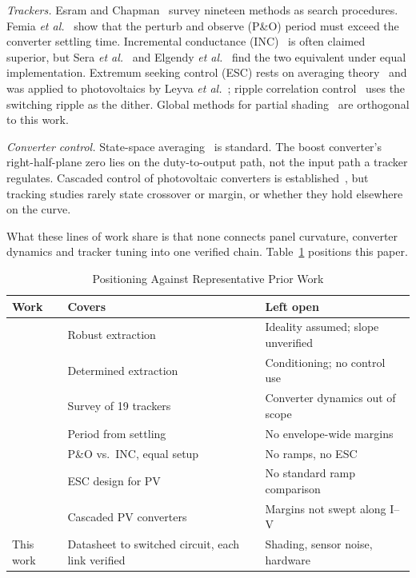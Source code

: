 \documentclass[journal]{IEEEtran}
\begin{document}
\emph{Trackers.} Esram and Chapman~\cite{esram} survey nineteen methods as search procedures. Femia
\emph{et al.}~\cite{femia,femia_book} show that the perturb and observe (P\&O) period must exceed the
converter settling time. Incremental conductance (INC)~\cite{hussein} is often claimed superior, but Sera
\emph{et al.}~\cite{sera} and Elgendy \emph{et al.}~\cite{elgendy} find the two equivalent under equal
implementation. Extremum seeking control (ESC) rests on averaging theory~\cite{krstic,ariyur} and was
applied to photovoltaics by Leyva \emph{et al.}~\cite{leyva}; ripple correlation control~\cite{rcc} uses
the switching ripple as the dither. Global methods for partial shading~\cite{nguyen} are orthogonal to
this work.

\emph{Converter control.} State-space averaging~\cite{middlebrook,erickson} is standard. The boost
converter's right-half-plane zero lies on the duty-to-output path, not the input path a tracker regulates.
Cascaded control of photovoltaic converters is established~\cite{bratcu,kjaer}, but tracking studies
rarely state crossover or margin, or whether they hold elsewhere on the curve.

What these lines of work share is that none connects panel curvature, converter dynamics and tracker
tuning into one verified chain. Table~\ref{tab:related} positions this paper.

\begin{table}[!t]
\centering
\caption{Positioning Against Representative Prior Work}
\label{tab:related}
\footnotesize
\setlength{\tabcolsep}{3pt}
\begin{tabular}{@{}>{\raggedright}p{}>{\raggedright}p{}>{\raggedright\arraybackslash}p{}@{}}
\toprule
Work & Covers & Left open \\
\midrule
\cite{villalva} & Robust extraction & Ideality assumed; slope unverified \\
\cite{desoto} & Determined extraction & Conditioning; no control use \\
\cite{esram} & Survey of 19 trackers & Converter dynamics out of scope \\
\cite{femia} & Period from settling & No envelope-wide margins \\
\cite{sera} & P\&O vs.\ INC, equal setup & No ramps, no ESC \\
\cite{leyva} & ESC design for PV & No standard ramp comparison \\
\cite{bratcu} & Cascaded PV converters & Margins not swept along I--V \\
\midrule
This work & Datasheet to switched circuit, each link verified & Shading, sensor noise, hardware \\
\bottomrule
\end{tabular}
\end{table}
\end{document}
